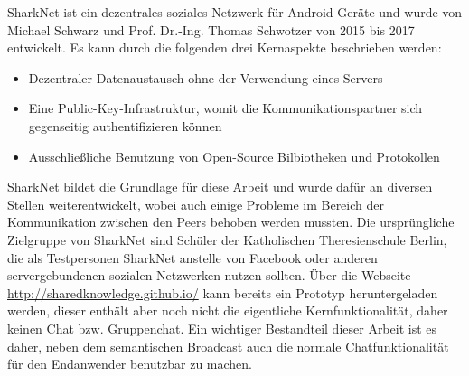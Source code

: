 SharkNet ist ein dezentrales soziales Netzwerk für Android Geräte und wurde von Michael Schwarz und Prof. Dr.-Ing. Thomas Schwotzer von 2015 bis 2017 entwickelt. Es kann durch die folgenden drei Kernaspekte beschrieben werden:
\begin{itemize}
	\item Dezentraler Datenaustausch ohne der Verwendung eines Servers
	\item Eine Public-Key-Infrastruktur, womit die Kommunikationspartner sich gegenseitig authentifizieren können
	\item Ausschließliche Benutzung von Open-Source Bilbiotheken und Protokollen\\
\end{itemize}
SharkNet bildet die Grundlage für diese Arbeit und wurde dafür an diversen Stellen weiterentwickelt, wobei auch einige Probleme im Bereich der Kommunikation zwischen den Peers behoben werden mussten. Die ursprüngliche Zielgruppe von SharkNet sind Schüler der Katholischen Theresienschule Berlin, die als Testpersonen SharkNet anstelle von Facebook oder anderen servergebundenen sozialen Netzwerken nutzen sollten. Über die Webseite \url{http://sharedknowledge.github.io/} kann bereits ein Prototyp heruntergeladen werden, dieser enthält aber noch nicht die eigentliche Kernfunktionalität, daher keinen Chat bzw. Gruppenchat. Ein wichtiger Bestandteil dieser Arbeit ist es daher, neben dem semantischen Broadcast auch die normale Chatfunktionalität für den Endanwender benutzbar zu machen.  
\newpage



